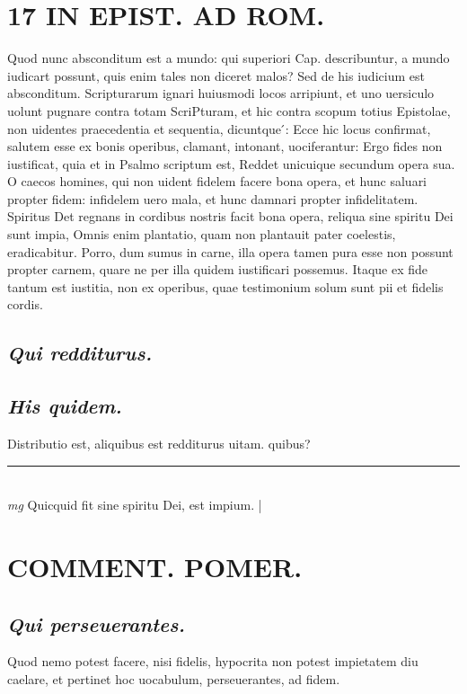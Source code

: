 \documentclass{article}
\begin{document}
\begin{pages}
\section*{17 IN EPIST. AD ROM.  }
\marginpar{[ p.]}\pstart Quod nunc absconditum est a mundo: qui superiori Cap. describuntur, a mundo iudicart possunt, quis enim tales non diceret malos? Sed de his iudicium est absconditum.   \pend\pstart Scripturarum ignari huiusmodi locos arripiunt, et uno uersiculo uolunt pugnare contra totam ScriPturam, et hic contra scopum totius Epistolae, non uidentes praecedentia et sequentia, dicuntque ́: Ecce hic locus confirmat, salutem esse ex bonis operibus, clamant, intonant, uociferantur: Ergo fides non iustificat, quia et in Psalmo scriptum est, Reddet unicuique secundum opera sua. O caecos homines, qui non uident fidelem facere bona opera, et hunc saluari propter fidem: infidelem uero mala, et hunc damnari propter infidelitatem. Spiritus Det regnans in cordibus nostris facit bona opera, reliqua sine spiritu Dei sunt impia, Omnis enim plantatio, quam non plantauit pater coelestis, eradicabitur. Porro, dum sumus in carne, illa opera tamen pura esse non possunt propter carnem, quare ne per illa quidem iustificari possemus. Itaque ex fide tantum est iustitia, non ex operibus, quae testimonium solum sunt pii et fidelis cordis.   \pend
{}
{}
\subsection*{\textit{Qui redditurus. }}
{}
\subsection*{\textit{His quidem. }}\pstart Distributio est, aliquibus est redditurus uitam.  quibus?  \pend
\vspace{0.5cm}\noindent
\vspace{0.2cm}\rule{1cm}{0.2pt}\\ 
\hspace{0.2cm}\textit{mg}
\footnotesize Quicquid fit sine spiritu Dei, est impium. 
\normalsize| 
\section*{COMMENT. POMER.  }
{}
\subsection*{\textit{Qui perseuerantes. }}\pstart Quod nemo potest facere, nisi fidelis, hypocrita non potest impietatem diu caelare, et pertinet hoc uocabulum, perseuerantes, ad fidem.   \pend
{}
{}

\end{pages}
\end{document}
